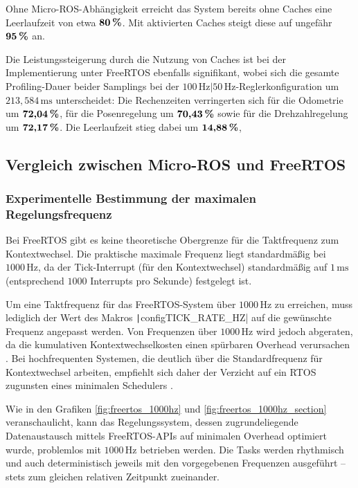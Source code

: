 Ohne Micro-ROS-Abhängigkeit erreicht das System bereits ohne Caches eine
Leerlaufzeit von etwa $\textbf{80\,\%}$. Mit aktivierten Caches steigt diese auf
ungefähr $\textbf{95\,\%}$ an.

Die Leistungssteigerung durch die Nutzung von Caches ist bei der Implementierung
unter FreeRTOS ebenfalls signifikant, wobei sich die gesamte Profiling-Dauer
beider Samplings bei der $100\,\text{Hz}|50\,\text{Hz}$-Reglerkonfiguration um
$213,584\,\text{ms}$ unterscheidet: Die Rechenzeiten verringerten sich für die
Odometrie um $\textbf{72,04\,\%}$, für die Posenregelung um $\textbf{70,43\,\%}$
sowie für die Drehzahlregelung um $\textbf{72,17\,\%}$. Die Leerlaufzeit stieg
dabei um $\textbf{14,88\,\%}$, 

\subsection{Vergleich zwischen Micro-ROS und FreeRTOS}

\subsubsection{Experimentelle Bestimmung der maximalen Regelungsfrequenz}

Bei FreeRTOS gibt es keine theoretische Obergrenze für die Taktfrequenz zum
Kontextwechsel. Die praktische maximale Frequenz liegt standardmäßig bei
$1000\,\text{Hz}$, da der Tick-Interrupt (für den Kontextwechsel) standardmäßig
auf $1\,\text{ms}$ (entsprechend $1000$ Interrupts pro Sekunde) festgelegt ist.

Um eine Taktfrequenz für das FreeRTOS-System über $1000\,\text{Hz}$ zu
erreichen, muss lediglich der Wert des Makros
\texttt|configTICK_RATE_HZ| auf die gewünschte Frequenz angepasst
werden. Von Frequenzen über $1000\,\text{Hz}$ wird jedoch abgeraten, da die
kumulativen Kontextwechselkosten einen spürbaren Overhead verursachen
\cite{FreertosTickRate2010}. Bei hochfrequenten Systemen, die deutlich über die
Standardfrequenz für Kontextwechsel arbeiten, empfiehlt sich daher der Verzicht
auf ein RTOS zugunsten eines minimalen Schedulers \cite{FreertosForumHF2019}.

Wie in den Grafiken \ref{fig:freertos_1000hz} und
\ref{fig:freertos_1000hz_section} veranschaulicht, kann das Regelungssystem,
dessen zugrundeliegende Datenaustausch mittels FreeRTOS-APIs auf minimalen
Overhead optimiert wurde, problemlos mit $1000\,\text{Hz}$ betrieben werden. Die
Tasks werden rhythmisch und auch deterministisch jeweils mit den vorgegebenen
Frequenzen ausgeführt -- stets zum gleichen relativen Zeitpunkt zueinander.

